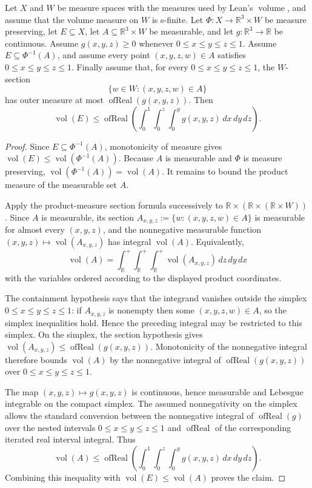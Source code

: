 \begin{helper}
Let \(X\) and \(W\) be measure spaces with the measures used by Lean's
\(\operatorname{volume}\), and assume that the volume measure on \(W\) is
s-finite.  Let
\(\Phi:X\to\mathbb R^3\times W\) be measure preserving, let
\(E\subseteq X\), let \(A\subseteq\mathbb R^3\times W\) be measurable, and let
\(g:\mathbb R^3\to\mathbb R\) be
continuous.  Assume \(g(x,y,z)\ge0\) whenever
\(0\le x\le y\le z\le1\).  Assume \(E\subseteq\Phi^{-1}(A)\), and assume
every point \((x,y,z,w)\in A\) satisfies \(0\le x\le y\le z\le1\).
Finally assume that, for every \(0\le x\le y\le z\le1\), the \(W\)-section
\[
\{w\in W:(x,y,z,w)\in A\}
\]
has outer measure at most \(\operatorname{ofReal}(g(x,y,z))\).  Then
\[
\operatorname{vol}(E)\le
\operatorname{ofReal}\left(\int_0^1\int_0^z\int_0^y
g(x,y,z)\,dx\,dy\,dz\right).
\]
\end{helper}
\begin{proof}
Since \(E\subseteq\Phi^{-1}(A)\), monotonicity of measure gives
\(\operatorname{vol}(E)\le \operatorname{vol}(\Phi^{-1}(A))\).  Because
\(A\) is measurable and \(\Phi\) is measure preserving,
\(\operatorname{vol}(\Phi^{-1}(A))=\operatorname{vol}(A)\).  It remains to
bound the product measure of the measurable set \(A\).

Apply the product-measure section formula successively to
\(\mathbb R\times(\mathbb R\times(\mathbb R\times W))\).  Since \(A\) is
measurable, its section \(A_{x,y,z}:=\{w:(x,y,z,w)\in A\}\) is measurable for
almost every \((x,y,z)\), and the nonnegative measurable function
\((x,y,z)\mapsto\operatorname{vol}(A_{x,y,z})\) has integral
\(\operatorname{vol}(A)\).  Equivalently,
\[
\operatorname{vol}(A)=
\int_{\mathbb R}^{+}\int_{\mathbb R}^{+}\int_{\mathbb R}^{+}
\operatorname{vol}(A_{x,y,z})\,dz\,dy\,dx
\]
with the variables ordered according to the displayed product coordinates.

The containment hypothesis says that the integrand vanishes outside the
simplex \(0\le x\le y\le z\le1\): if \(A_{x,y,z}\) is nonempty then some
\((x,y,z,w)\in A\), so the simplex inequalities hold.  Hence the preceding
integral may be restricted to this simplex.  On the simplex, the section
hypothesis gives
\(\operatorname{vol}(A_{x,y,z})\le\operatorname{ofReal}(g(x,y,z))\).
Monotonicity of the nonnegative integral therefore bounds \(\operatorname{vol}(A)\)
by the nonnegative integral of \(\operatorname{ofReal}(g(x,y,z))\) over
\(0\le x\le y\le z\le1\).

The map \((x,y,z)\mapsto g(x,y,z)\) is continuous, hence measurable and
Lebesgue integrable on the compact simplex.  The assumed nonnegativity on the
simplex allows the standard conversion between the nonnegative integral of
\(\operatorname{ofReal}(g)\) over the nested intervals
\(0\le x\le y\le z\le1\) and \(\operatorname{ofReal}\) of the corresponding
iterated real interval integral.  Thus
\[
\operatorname{vol}(A)\le
\operatorname{ofReal}\left(\int_0^1\int_0^z\int_0^y
g(x,y,z)\,dx\,dy\,dz\right).
\]
Combining this inequality with
\(\operatorname{vol}(E)\le\operatorname{vol}(A)\) proves the claim.
\end{proof}
